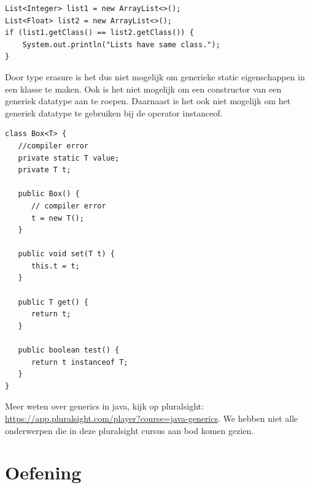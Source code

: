 \documentclass{tstextbook}
\begin{document}
\begin{lstlisting}
List<Integer> list1 = new ArrayList<>();
List<Float> list2 = new ArrayList<>();
if (list1.getClass() == list2.getClass()) {
	System.out.println("Lists have same class.");
}
\end{lstlisting}

Door type erasure is het dus niet mogelijk om generieke static eigenschappen in een klasse te maken.
Ook is het niet mogelijk om een constructor van een generiek datatype aan te roepen.
Daarnaast is het ook niet mogelijk om het generiek datatype te gebruiken bij de operator instanceof.

\begin{lstlisting}
class Box<T> {
   //compiler error
   private static T value;
   private T t;
   
   public Box() {
      // compiler error
   	  t = new T();
   }

   public void set(T t) {
      this.t = t;
   }

   public T get() {
      return t;
   } 
   
   public boolean test() {
	  return t instanceof T;
   }  
}
\end{lstlisting}

\begin{remark}
  Meer weten over generics in java, kijk op pluralsight: \url{https://app.pluralsight.com/player?course=java-generics}. We hebben niet alle onderwerpen die in deze pluralsight cursus aan bod komen gezien.
\end{remark}


\section{Oefening}
\end{document}
